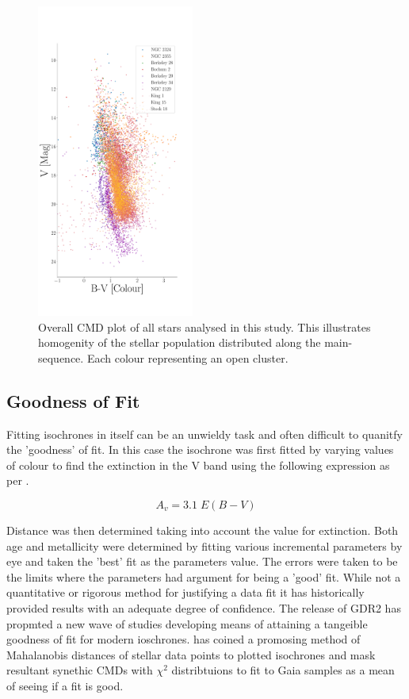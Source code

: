 \begin{figure}
  \centering
  \includegraphics[width = 0.46\textwidth]{figures/master_cmd.pdf}
  \caption{Overall CMD plot of all stars analysed in this study. This illustrates homogenity of the stellar population distributed along the main-sequence. Each colour representing an open cluster.} 
\end{figure}

\subsection{Goodness of Fit}

Fitting isochrones in itself can be an unwieldy task and often difficult to quanitfy the 'goodness' of fit. In this case the isochrone was first fitted by varying values of colour to find the extinction in the V band using the following expression as per \cite[pg. 237]{dyson1980physics}. 

\begin{equation}
  A_v = 3.1 \; E(B - V)
\end{equation}

Distance was then determined taking into account the value for extinction. Both age and metallicity were determined by fitting various incremental parameters by eye and taken the 'best' fit as the parameters value. The errors were taken to be the limits where the parameters had argument for being a 'good' fit. While not a quantitative or rigorous method for justifying a data fit it has historically provided results with an adequate degree of confidence. The release of GDR2 has propmted a new wave of studies developing means of attaining a tangeible goodness of fit for modern ioschrones. \cite{2021A&A...649A.127V} has coined a promosing method of Mahalanobis distances of stellar data points to plotted isochrones and mask resultant synethic CMDs with $\chi^2$ distribtuions to fit to Gaia samples as a mean of seeing if a fit is good.



